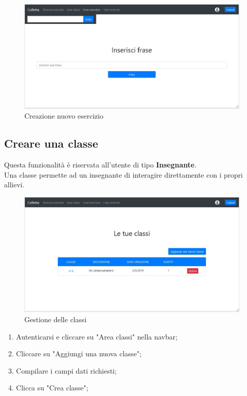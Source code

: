 \documentclass[11pt,a4paper]{article}
\begin{document}
{		\begin{figure}[h]
			\centering
			\includegraphics[scale=0.65]{images/creaes.jpg}
			\caption{Creazione nuovo esercizio}
		\end{figure}

	\subsection{Creare una classe}
		Questa funzionalità è riservata all'utente di tipo \textbf{Insegnante}.\\
		Una classe permette ad un insegnante di interagire direttamente con i propri allievi.
		
			\begin{figure}[h!]
				\centering
				\includegraphics[scale=0.65]{images/classi.jpg}
				\caption{Gestione delle classi}
			\end{figure}
	
		\begin{enumerate}
			\item Autenticarsi e cliccare su "Area classi" nella navbar;
			\item Cliccare su "Aggiungi una nuova classe";
			\item Compilare i campi dati richiesti;
			\item Clicca su "Crea classe";
		\end{enumerate}
	
}
\end{document}
